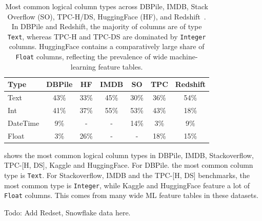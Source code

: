 
\begin{table}
\caption{
        Most common logical column types across DBPile, IMDB, Stack Overflow (SO), TPC-H/DS, HuggingFace (HF), and 
        Redshift~\cite{van_renen_why_2024}. In DBPile and Redshift, the majority of columns are of type \texttt{Text},
         whereas TPC-H and TPC-DS are dominated by \texttt{Integer} columns. HuggingFace contains a comparatively 
         large share of \texttt{Float} columns, reflecting the prevalence of wide machine-learning feature tables.
        }
\label{tab:column-types}
\begin{tabular}{lcccccc}
\toprule
\textbf{Type} & \textbf{DBPile} & \textbf{HF} & \textbf{IMDB} & \textbf{SO} & \textbf{TPC} & \textbf{Redshift} \\
\midrule
Text & 43\% & 33\% & 45\% & 30\% & 36\% & 54\% \\
Int & 41\% & 37\% & 55\% & 53\% & 43\% & 18\% \\
DateTime & 9\% & - & - & 14\% & 3\% & 9\% \\
Float & 3\% & 26\% & - & - & 18\% & 15\% \\
\bottomrule
\end{tabular}
\end{table}


 shows the most common logical column types in DBPile, IMDB, Stackoverflow, TPC-[H, DS], Kaggle and HuggingFace. 
For DBPile. the most common column type is \texttt{Text}. For Stackoverflow, IMDB and the TPC-[H, DS] benchmarks, the most common type is \texttt{Integer},
while Kaggle and HuggingFace feature a lot of \texttt{Float} columns. This comes from many wide ML feature tables in these datasets.

Todo: Add Redset, Snowflake data here. 